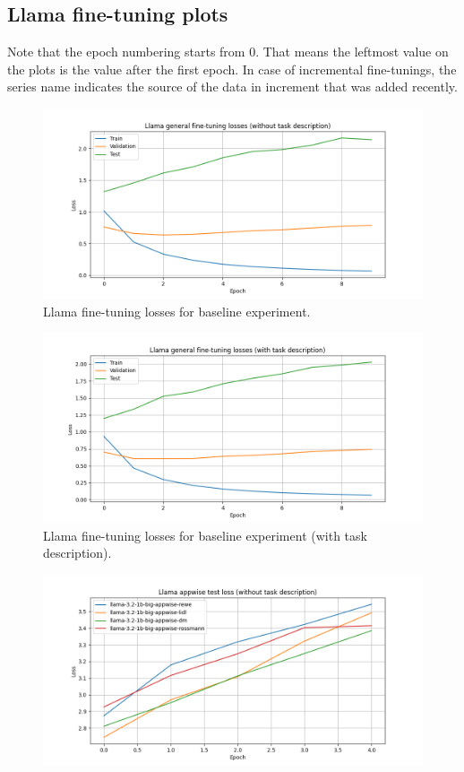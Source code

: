 \documentclass[licencjacka,en]{pracamgr}
\begin{document}
\begin{appendices}
\chapter{Llama fine-tuning plots} \label{AppH}
Note that the epoch numbering starts from 0. That means the leftmost value on the plots is the value after the first epoch.
In case of incremental fine-tunings, the series name indicates the source of the data in increment that was added recently.
\begin{figure}[ht]
    \centering
    \includegraphics[width=0.8\linewidth]{bachelor_images/llama_ft/llama-wth-loss.png}
    \caption{Llama fine-tuning losses for baseline experiment.}
    \label{fig:llama-wth-loss}
\end{figure}
\begin{figure}[ht]
    \centering
    \includegraphics[width=0.8\linewidth]{bachelor_images/llama_ft/llama-w-loss.png}
    \caption{Llama fine-tuning losses for baseline experiment (with task description).}
    \label{fig:llama-w-loss}
\end{figure}
\begin{figure}[ht]
    \centering
    \includegraphics[width=0.8\linewidth]{bachelor_images/llama_ft/llama-appwise-wth-test.png}

\end{figure}
\end{appendices}
\end{document}
